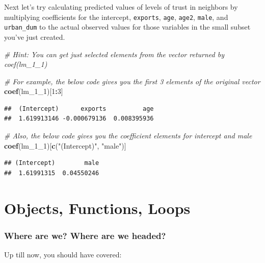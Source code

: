 \documentclass[]{book}
\newenvironment{Shaded}{\begin{snugshade}}{\end{snugshade}}
\newcommand{\KeywordTok}[1]{\textcolor[rgb]{0.13,0.29,0.53}{\textbf{#1}}}
\newcommand{\DecValTok}[1]{\textcolor[rgb]{0.00,0.00,0.81}{#1}}
\newcommand{\StringTok}[1]{\textcolor[rgb]{0.31,0.60,0.02}{#1}}
\newcommand{\CommentTok}[1]{\textcolor[rgb]{0.56,0.35,0.01}{\textit{#1}}}
\newcommand{\OperatorTok}[1]{\textcolor[rgb]{0.81,0.36,0.00}{\textbf{#1}}}
\newcommand{\NormalTok}[1]{#1}
\theoremstyle{definition}
\theoremstyle{definition}
\theoremstyle{definition}
\theoremstyle{remark}
\begin{document}
Next let's try calculating predicted values of levels of trust in
neighbors by multiplying coefficients for the intercept,
\texttt{exports}, \texttt{age}, \texttt{age2}, \texttt{male}, and
\texttt{urban\_dum} to the actual observed values for those variables in
the small subset you've just created.

\begin{Shaded}
\begin{Highlighting}[]
\CommentTok{# Hint: You can get just selected elements from the vector returned by coef(lm_1_1)}

\CommentTok{# For example, the below code gives you the first 3 elements of the original vector}
\KeywordTok{coef}\NormalTok{(lm_1_}\DecValTok{1}\NormalTok{)[}\DecValTok{1}\OperatorTok{:}\DecValTok{3}\NormalTok{]}
\end{Highlighting}
\end{Shaded}

\begin{verbatim}
##  (Intercept)      exports          age 
##  1.619913146 -0.000679136  0.008395936
\end{verbatim}

\begin{Shaded}
\begin{Highlighting}[]
\CommentTok{# Also, the below code gives you the coefficient elements for intercept and male}
\KeywordTok{coef}\NormalTok{(lm_1_}\DecValTok{1}\NormalTok{)[}\KeywordTok{c}\NormalTok{(}\StringTok{"(Intercept)"}\NormalTok{, }\StringTok{"male"}\NormalTok{)]}
\end{Highlighting}
\end{Shaded}

\begin{verbatim}
## (Intercept)        male 
##  1.61991315  0.04550246
\end{verbatim}

\chapter{Objects, Functions, Loops}\label{robjloops}

\subsection*{Where are we? Where are we
headed?}\label{where-are-we-where-are-we-headed-2}

Up till now, you should have covered:
\end{document}
